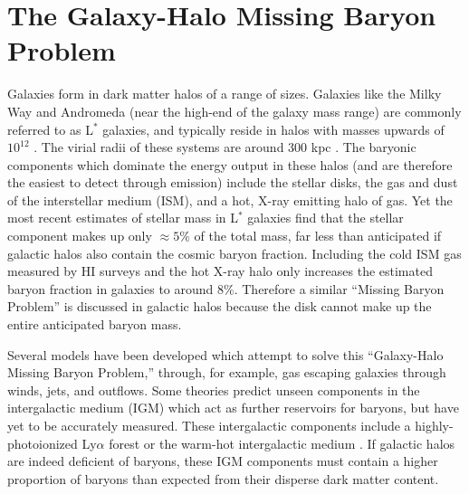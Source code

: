 \section{The Galaxy-Halo Missing Baryon Problem}
\label{sec:Missing.Galaxies}

Galaxies form in dark matter halos of a range of sizes. Galaxies like
the Milky Way and Andromeda (near the high-end of the galaxy mass
range) are commonly referred to as L$^*$ galaxies, and typically
reside in halos with masses upwards of $10^{12}$ \Msun{}
\citep{Moster2010}. The virial radii of these systems are around 300
kpc \citep[][and refs.~therein]{Werk2014}. The baryonic components
which dominate the energy output in these halos (and are therefore the
easiest to detect through emission) include the stellar disks, the gas
and dust of the interstellar medium (ISM), and a hot, X-ray emitting
halo of gas. Yet the most recent estimates of stellar mass in L$^*$
galaxies \citep{Behroozi2010} find that the stellar component makes up
only $\approx5\%$ of the total mass, far less than anticipated if
galactic halos also contain the cosmic baryon fraction. Including the
cold ISM gas measured by HI surveys and the hot X-ray halo
\citep[][respectively]{Martin2010, Gupta2012} only increases the
estimated baryon fraction in galaxies to around $8\%$. Therefore a
similar ``Missing Baryon Problem'' is discussed in galactic halos
because the disk cannot make up the entire anticipated baryon mass.

Several models have been developed which attempt to solve this
``Galaxy-Halo Missing Baryon Problem,'' through, for example, gas
escaping galaxies through winds, jets, and outflows. Some theories
predict unseen components in the intergalactic medium (IGM) which act
as further reservoirs for baryons, but have yet to be accurately
measured. These intergalactic components include a highly-photoionized
Ly$\alpha$ forest \citep{Sargent1980, Cen1994} or the warm-hot
intergalactic medium \citep[WHIM][]{Cen1999, Dave1999}. If galactic
halos are indeed deficient of baryons, these IGM components must
contain a higher proportion of baryons than expected from their
disperse dark matter content.

